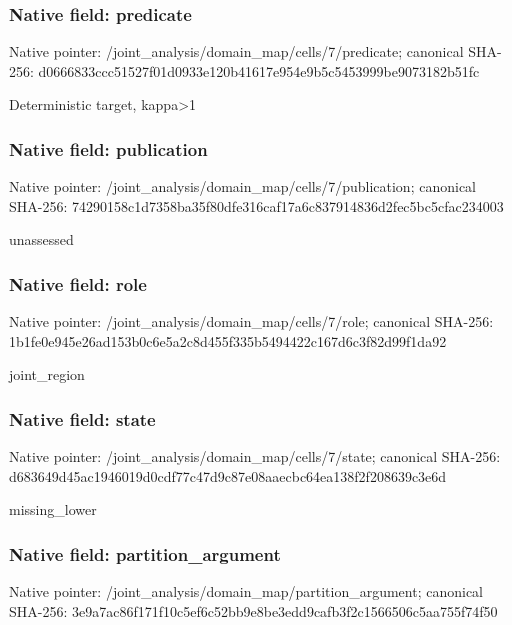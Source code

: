 \documentclass[10pt,a4paper]{article}
\begin{document}
\subsubsection{Native field: predicate}
Native pointer: /joint\_\allowbreak{}analysis/domain\_\allowbreak{}map/cells/7/predicate; canonical SHA-256: d0666833ccc51527f01d0933e120b41617e954e9b5c5453999be9073182b51fc

\begingroup\raggedright\sloppy Deterministic target,\allowbreak{} kappa>1\par\endgroup

\subsubsection{Native field: publication}
Native pointer: /joint\_\allowbreak{}analysis/domain\_\allowbreak{}map/cells/7/publication; canonical SHA-256: 74290158c1d7358ba35f80dfe316caf17a6c837914836d2fec5bc5cfac234003

\begingroup\raggedright\sloppy unassessed\par\endgroup

\subsubsection{Native field: role}
Native pointer: /joint\_\allowbreak{}analysis/domain\_\allowbreak{}map/cells/7/role; canonical SHA-256: 1b1fe0e945e26ad153b0c6e5a2c8d455f335b5494422c167d6c3f82d99f1da92

\begingroup\raggedright\sloppy joint\_\allowbreak{}region\par\endgroup

\subsubsection{Native field: state}
Native pointer: /joint\_\allowbreak{}analysis/domain\_\allowbreak{}map/cells/7/state; canonical SHA-256: d683649d45ac1946019d0cdf77c47d9c87e08aaecbc64ea138f2f208639c3e6d

\begingroup\raggedright\sloppy missing\_\allowbreak{}lower\par\endgroup

\subsubsection{Native field: partition\_\allowbreak{}argument}
Native pointer: /joint\_\allowbreak{}analysis/domain\_\allowbreak{}map/partition\_\allowbreak{}argument; canonical SHA-256: 3e9a7ac86f171f10c5ef6c52bb9e8be3edd9cafb3f2c1566506c5aa755f74f50
\end{document}
